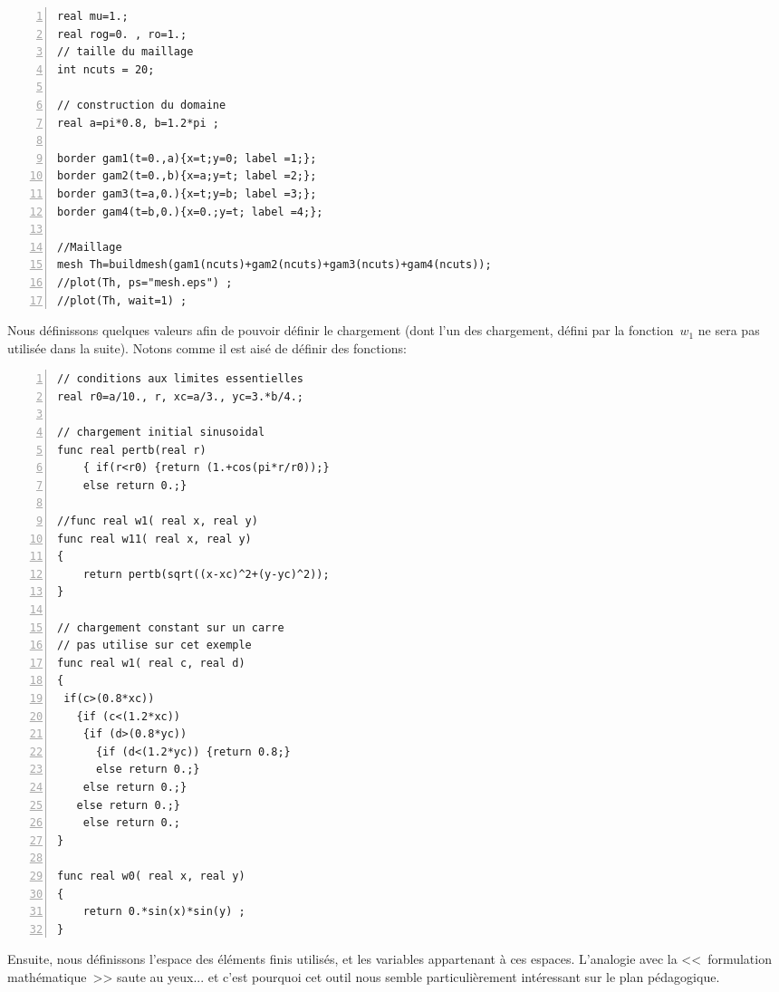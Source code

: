 \medskip
\color{gris}\scriptsize
\begin{Verbatim}[numbers=left,numbersep=3pt]
real mu=1.; 
real rog=0. , ro=1.;
// taille du maillage
int ncuts = 20;

// construction du domaine
real a=pi*0.8, b=1.2*pi ; 

border gam1(t=0.,a){x=t;y=0; label =1;};
border gam2(t=0.,b){x=a;y=t; label =2;};
border gam3(t=a,0.){x=t;y=b; label =3;};
border gam4(t=b,0.){x=0.;y=t; label =4;};

//Maillage
mesh Th=buildmesh(gam1(ncuts)+gam2(ncuts)+gam3(ncuts)+gam4(ncuts)); 
//plot(Th, ps="mesh.eps") ;
//plot(Th, wait=1) ;
\end{Verbatim}
\color{black}\normalsize

\medskip
Nous définissons quelques valeurs afin de pouvoir définir le chargement (dont l'un des chargement,
défini par la fonction~$w_1$ ne sera pas utilisée dans la suite). Notons comme il est aisé de définir
des fonctions:

\color{gris}\scriptsize
\begin{multicols}{2}
\begin{Verbatim}[numbers=left,numbersep=3pt,firstnumber=last]
// conditions aux limites essentielles 
real r0=a/10., r, xc=a/3., yc=3.*b/4.; 

// chargement initial sinusoidal
func real pertb(real r)
	{ if(r<r0) {return (1.+cos(pi*r/r0));}
	else return 0.;}

//func real w1( real x, real y)
func real w11( real x, real y)
{
	return pertb(sqrt((x-xc)^2+(y-yc)^2)); 
}

// chargement constant sur un carre
// pas utilise sur cet exemple
func real w1( real c, real d)
{
 if(c>(0.8*xc))
   {if (c<(1.2*xc)) 
    {if (d>(0.8*yc))
      {if (d<(1.2*yc)) {return 0.8;}
      else return 0.;}
    else return 0.;}
   else return 0.;}
	else return 0.;
}

func real w0( real x, real y)
{
	return 0.*sin(x)*sin(y) ; 
}
\end{Verbatim}
\end{multicols}
\color{black}\normalsize

\medskip
Ensuite, nous définissons l'espace des éléments finis utilisés, et les variables appartenant à ces espaces.
L'analogie avec la <<~formulation mathématique~>> saute au yeux... et c'est pourquoi cet outil
nous semble particulièrement intéressant sur le plan pédagogique.


